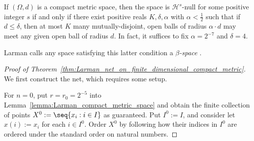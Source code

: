 \begin{lemma}
    \label{lemma:Larman_beta_spaces}
    If $(\Omega, d)$ is a compact metric space, then the space is $\mathcal{H}^s$-null for some positive integer $s$ if and only if there exist positive reals $K, \delta, \alpha$ with $\alpha < \frac{1}{2}$ such that if $d \leq \delta$, then at most $K$ many mutually-disjoint, open balls of radius $\alpha \cdot d$ may meet any given open ball of radius $d$. In fact, it suffices to fix $\alpha = 2^{-7}$ and $\delta = 4$. 
\end{lemma}
Larman calls any space satisfying this latter condition a \textit{$\beta$-space} \cite{Lar67}.

\begin{proof}[Proof of Theorem~\ref{thm:Larman_net_on_finite_dimensional_compact_metric}]

    We first construct the net, which requires some setup.
    
    For $n = 0$, put $r = r_0 = 2^{-5}$ into Lemma~\ref{lemma:Larman_compact_metric_space} and obtain the finite collection of points $X^0 := \seq{x_i : i \in I}$ as guaranteed. Put $I^0 := I$, and consider let $x(i) := x_i$ for each $i \in I^0$. Order $X^0$ by following how their indices in $I^0$ are ordered under the standard order on natural numbers. 


\end{proof}
